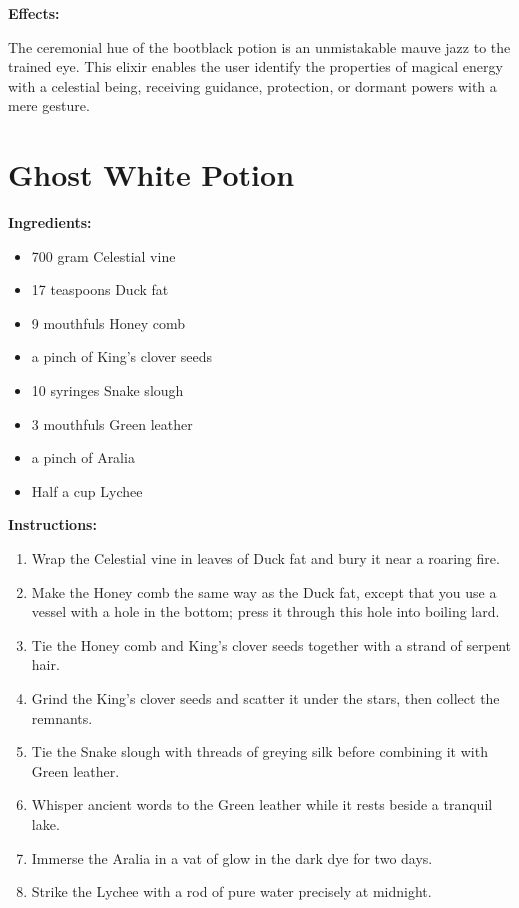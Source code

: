 \documentclass{article}
\begin{document}
\textbf{Effects:}

The ceremonial hue of the bootblack potion is an unmistakable mauve jazz to the trained eye. This elixir enables the user identify the properties of magical energy with a celestial being, receiving guidance, protection, or dormant powers with a mere gesture.

\newpage
\section*{Ghost White Potion}

\textbf{Ingredients:}

\begin{itemize}
  \item 700 gram Celestial vine
  \item 17 teaspoons Duck fat
  \item 9 mouthfuls Honey comb
  \item a pinch of King's clover seeds
  \item 10 syringes Snake slough
  \item 3 mouthfuls Green leather
  \item a pinch of Aralia
  \item Half a cup Lychee
\end{itemize}

\textbf{Instructions:}

\begin{enumerate}
  \item Wrap the Celestial vine in leaves of Duck fat and bury it near a roaring fire.
  \item Make the Honey comb the same way as the Duck fat, except that you use a vessel with a hole in the bottom; press it through this hole into boiling lard.
  \item Tie the Honey comb and King's clover seeds together with a strand of serpent hair.
  \item Grind the King's clover seeds and scatter it under the stars, then collect the remnants.
  \item Tie the Snake slough with threads of greying silk before combining it with Green leather.
  \item Whisper ancient words to the Green leather while it rests beside a tranquil lake.
  \item Immerse the Aralia in a vat of glow in the dark dye for two days.
  \item Strike the Lychee with a rod of pure water precisely at midnight.
\end{enumerate}
\end{document}
